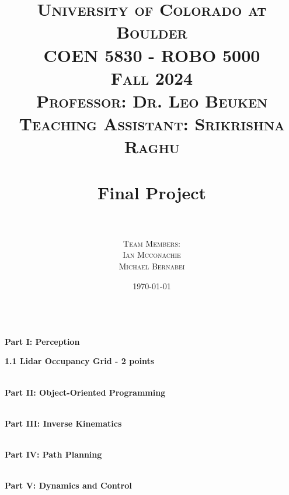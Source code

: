 \documentclass[paper=a4, fontsize=11pt]{scrartcl} %
\title{
\normalfont \LARGE
\textsc{University of Colorado at Boulder} \\ [25pt] %
\textsc{COEN 5830 - ROBO 5000} \\ [20pt]
\textsc{Fall 2024} \\ [20pt]
\textsc{Professor: Dr. Leo Beuken} \\ [12pt]
\textsc{Teaching Assistant: Srikrishna Raghu} \\ [12pt]
\horrule{1pt} \\[0.4cm] %
\huge Final Project \\ %
\horrule{1pt} \\[0.6cm] %
}
\author{
  \textsc{ Team Members:} \\ [4 mm]
  \textsc{ Ian Mcconachie}\\[2mm]
  \textsc{ Michael Bernabei}\\[2mm]
}
\date{\normalsize\today} %
\numberwithin{equation}{section} %
\numberwithin{figure}{section} %
\numberwithin{table}{section} %
\begin{document}
\maketitle %
\thispagestyle{empty} %
\newpage


%

\textbf{\\ Part I: Perception }
\begin{framed}
\textbf{1.1 Lidar Occupancy Grid - 2 points} \\
\end{framed}


\textbf{\\ Part II: Object-Oriented Programming }
\begin{framed}
\end{framed}

\textbf{\\ Part III: Inverse Kinematics }
\begin{framed}
\end{framed}

\textbf{\\ Part IV: Path Planning }
\begin{framed}
\end{framed}

\textbf{\\ Part V: Dynamics and Control }
\begin{framed}
\end{framed}
\end{document}
